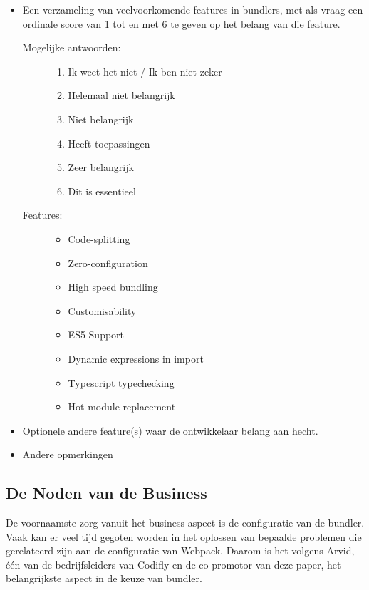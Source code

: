 \begin{itemize}
    \item Een verzameling van veelvoorkomende features in bundlers, met als vraag een ordinale score van 1 tot en met 6 te geven op het belang van die feature.
    \begin{description}
        \item[Mogelijke antwoorden:] \hfill
        \begin{enumerate}
            \item Ik weet het niet / Ik ben niet zeker
            \item Helemaal niet belangrijk
            \item Niet belangrijk
            \item Heeft toepassingen
            \item Zeer belangrijk
            \item Dit is essentieel
        \end{enumerate}
        \item[Features:] \hfill
        \begin{itemize}
            \item Code-splitting
            \item Zero-configuration
            \item High speed bundling
            \item Customisability
            \item ES5 Support
            \item Dynamic expressions in import
            \item Typescript typechecking
            \item Hot module replacement
        \end{itemize}
    \end{description}
    \item Optionele andere feature(s) waar de ontwikkelaar belang aan hecht.
    \item Andere opmerkingen
\end{itemize}


\subsection{De Noden van de Business}

De voornaamste zorg vanuit het business-aspect is de configuratie van de bundler. Vaak kan er veel tijd gegoten worden in het oplossen van bepaalde problemen die gerelateerd zijn aan de configuratie van Webpack. Daarom is het volgens Arvid, één van de bedrijfsleiders van Codifly en de co-promotor van deze paper, het belangrijkste aspect in de keuze van bundler.

